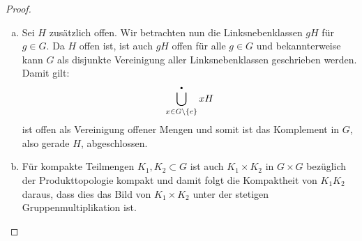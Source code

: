 \begin{proof}
\begin{enumerate}[(a)]
        \item
            Sei $H$ zusätzlich offen. Wir betrachten nun die Linksnebenklassen
            $gH$ für $g\in G$. Da $H$ offen ist, ist auch $gH$ offen für alle
            $g\in G$ und bekannterweise kann $G$ als disjunkte Vereinigung aller
            Linksnebenklassen geschrieben werden. Damit gilt:
            \[ \bigdotcup_{x\in G\setminus\{e\}} xH \]
            ist offen als Vereinigung offener Mengen und somit ist das
            Komplement in $G$, also gerade $H$, abgeschlossen.

        \item
            Für kompakte Teilmengen $K_1,K_2\subset G$ ist auch $K_1\times K_2$
            in $G\times G$ bezüglich der Produkttopologie kompakt und damit
            folgt die Kompaktheit von $K_1K_2$ daraus, dass dies das Bild von
            $K_1\times K_2$ unter der stetigen Gruppenmultiplikation ist.
    \end{enumerate}
\end{proof}






































